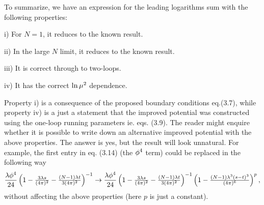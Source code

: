 To summarize, we have an expression for the leading logarithms sum
with the following properties:
\item{i)} For $N=1$, it reduces to the known result.
\item{ii)} In the large $N$ limit, it reduces to the known result.
\item{iii)} It is correct through to two-loops.
\item{iv)} It has the correct $\ln\mu^2$ dependence.

Property i) is a consequence of the proposed boundary conditions
eq.(3.7),
while property iv) is a just a statement that the improved potential
was constructed using the one-loop running parameters ie. eqs. (3.9).
The reader might enquire whether it is possible to write down an
alternative improved potential with the above properties. The answer
is yes, but the result will look unnatural. For example,
 the first entry in eq. (3.14) (the $\phi^4$ term) could be
replaced in the following way
$${\lambda\phi^4\over{24}}\left(1-\hbox{${3\lambda s\over{(4\pi)^2}}$}-\hbox{${(N-1)\lambda t\over{3(4\pi)^2}}$}\right)^{-1}\rightarrow
{\lambda\phi^4\over{24}}\left(1-\hbox{${3\lambda s\over{(4\pi)^2}}$}-\hbox{${(N-1)\lambda t\over{3(4\pi)^2}}$}\right)^{-1}
\left(1-\hbox{${(N-1)\lambda^3(s-t)^3\over{(4\pi)^6}}$}\right)^p,$$
without affecting the above properties (here $p$ is just a constant).



\line{\hfill}
\line{\hfill}

